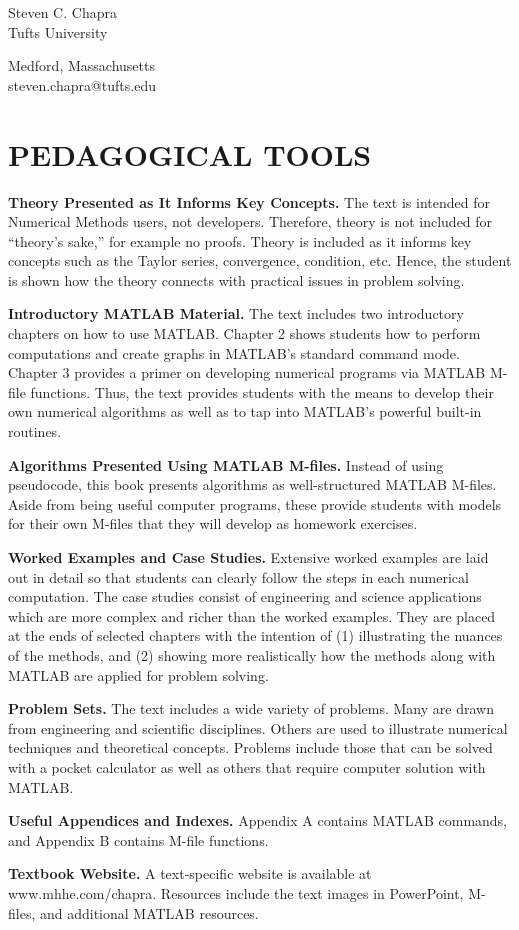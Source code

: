 \documentclass[../main.tex]{subfiles}
\begin{document}
\begin{flushright}
Steven C. Chapra\\
Tufts University



Medford, Massachusetts\\
steven.chapra@tufts.edu\\
\end{flushright}


\bigskip
\section*{PEDAGOGICAL TOOLS}
\label{sec:sec_P_1_1}


\textbf{Theory Presented as It Informs Key Concepts.} The text is intended for Numerical Methods users, not developers. Therefore, theory is not included for “theory’s sake,” for example no
proofs. Theory is included as it informs key concepts such as the Taylor series, convergence,
condition, etc. Hence, the student is shown how the theory connects with practical issues in
problem solving.


\textbf{Introductory MATLAB Material.} The text includes two introductory chapters on how to
use MATLAB. Chapter 2 shows students how to perform computations and create graphs
in MATLAB’s standard command mode. Chapter 3 provides a primer on developing
numerical programs via MATLAB M-file functions. Thus, the text provides students with
the means to develop their own numerical algorithms as well as to tap into MATLAB’s
powerful built-in routines.

\textbf{Algorithms Presented Using MATLAB M-files.} Instead of using pseudocode, this book
presents algorithms as well-structured MATLAB M-files. Aside from being useful computer programs, these provide students with models for their own M-files that they will
develop as homework exercises.

\textbf{Worked Examples and Case Studies.} Extensive worked examples are laid out in detail
so that students can clearly follow the steps in each numerical computation. The case studies consist of engineering and science applications which are more complex and richer than
the worked examples. They are placed at the ends of selected chapters with the intention of
(1) illustrating the nuances of the methods, and (2) showing more realistically how the
methods along with MATLAB are applied for problem solving.

\textbf{Problem Sets.} The text includes a wide variety of problems. Many are drawn from engineering and scientific disciplines. Others are used to illustrate numerical techniques and
theoretical concepts. Problems include those that can be solved with a pocket calculator as
well as others that require computer solution with MATLAB.

\textbf{Useful Appendices and Indexes.} Appendix A contains MATLAB commands, and
Appendix B contains M-file functions.

\textbf{Textbook Website.} A text-specific website is available at www.mhhe.com/chapra. Resources include the text images in PowerPoint, M-files, and additional MATLAB resources.
\blankpage
\end{document}
